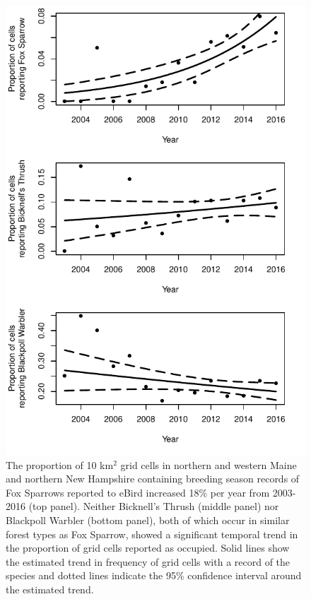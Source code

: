 \documentclass[fleqn,10pt,lineno]{wlpeerj} %
\begin{document}
\begin{figure}[ht]\centering
\includegraphics[width=\linewidth]{Figure3}
\caption{The proportion of 10 km$^{2}$ grid cells in northern and western Maine and northern New Hampshire containing breeding season records of Fox Sparrows reported to eBird increased 18\% per year from 2003-2016 (top panel). Neither Bicknell’s Thrush (middle panel) nor Blackpoll Warbler (bottom panel), both of which occur in similar forest types as Fox Sparrow, showed a significant temporal trend in the proportion of grid cells reported as occupied. Solid lines show the estimated trend in frequency of grid cells with a record of the species and dotted lines indicate the 95\% confidence interval around the estimated trend.}
\label{fig:Figure3}
\end{figure}
\end{document}
